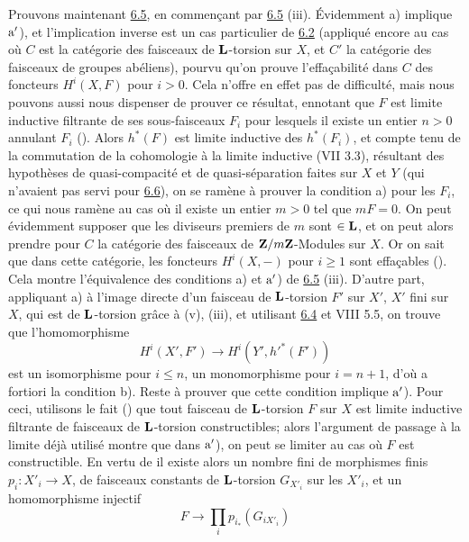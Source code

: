 \documentclass[10pt]{../fichiers-configuration-latex/smfart}
\begin{document}
Prouvons maintenant \hyperref[XII.prop6.5]{6.5}, en commençant par \hyperref[XII.prop6.5]{6.5} (iii). Évidemment a)
implique ${\rm a'}$), et l'implication inverse est un cas particulier
de \hyperref[XII.lem6.2]{6.2} (appliqué encore au cas où $C$ est la catégorie des faisceaux
de $\mathbf{L}$-torsion sur $X$, et $C'$ la catégorie des faisceaux de
groupes abéliens), pourvu qu'on prouve l'effaçabilité dans $C$ des
foncteurs $H^{i}(X,F)$ pour $i>0$. Cela n'offre en effet pas de
difficulté, mais nous pouvons aussi nous dispenser de prouver ce
résultat, en\pageoriginale notant que $F$ est limite inductive
filtrante de ses sous-faisceaux $F_i$ pour lesquels il existe un
entier $n>0$ annulant $F_i$ (). Alors $h^{\ast}(F)$ est limite
inductive des $h^{\ast}(F_i)$, et compte tenu de la commutation de la
cohomologie à la limite inductive (VII 3.3), résultant des hypothèses
de quasi-compacité et de quasi-séparation faites sur $X$ et $Y$ (qui
n'avaient pas servi pour \hyperref[XII.cor6.6]{6.6}), on se ramène à prouver la condition a)
pour les $F_i$, ce qui nous ramène au cas où il existe un entier $m>0$
tel que $mF=0$. On peut évidemment supposer que les diviseurs premiers
de $m$ sont $\in \mathbf{L}$, et on peut alors prendre pour $C$ la
catégorie des faisceaux de $\mathbf{Z}/m\mathbf{Z}$-Modules sur
$X$. Or on sait que dans cette catégorie, les foncteurs $H^{i}(X, -)$
pour $i\geq 1$ sont effaçables (\quad). Cela montre l'équivalence
des conditions a) et ${\rm a'}$) de \hyperref[XII.prop6.5]{6.5} (iii). D'autre part,
appliquant a) à l'image directe d'un faisceau de $\mathbf{L}$-torsion
$F'$ sur $X'$, $X'$ fini sur $X$, qui est de $\mathbf{L}$-torsion
grâce à  (v),  (iii), et 
utilisant \hyperref[XII.lem6.4]{6.4} et VIII 5.5, on trouve
que l'homomorphisme
$$
H^{i}(X',F')\longrightarrow H^{i}(Y',{h'}^{\ast}(F'))
$$
est un isomorphisme pour $i\leq n$, un monomorphisme pour $i=n+1$,
d'où a fortiori la condition b). Reste à prouver que cette condition
implique ${\rm a'}$). Pour ceci, utilisons le fait () que tout
faisceau de $\mathbf{L}$-torsion $F$ sur $X$ est limite inductive
filtrante de faisceaux de $\mathbf{L}$-torsion constructibles; alors
l'argument de passage à la limite déjà utilisé montre que dans ${\rm
a'}$), on peut se limiter au cas où $F$ est constructible. En vertu de
 il existe alors un nombre fini de morphismes finis
$p_i:X'_i\rightarrow X$, de faisceaux constants de
$\mathbf{L}$-torsion $G_{X'_i}$ sur les $X'_i$, et un homomorphisme
injectif
$$
F\longrightarrow \prod_{i}p_{i_{\ast}}(G_{i X'_i})
$$
\end{document}
